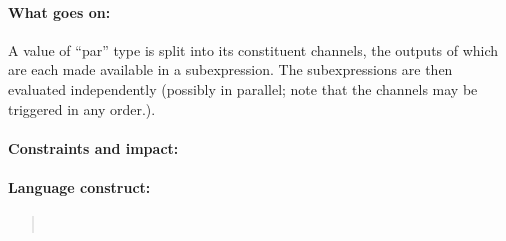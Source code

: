 \documentclass[a4paper]{article}
\begin{document}
\paragraph{What goes on:} A value of ``par'' type is split into its
constituent channels, the outputs of which are each made available in
a subexpression. The subexpressions are then evaluated independently
(possibly in parallel; note that the channels may be triggered in any order.).

\paragraph{Constraints and impact:}
\paragraph{Language construct:}
\begin{quote}\tt
\end{quote}






\end{document}
